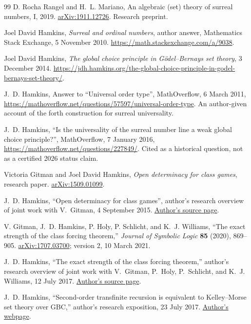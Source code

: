 \documentclass[11pt]{article}
\theoremstyle{definition}
\theoremstyle{remark}
\begin{document}
\begin{thebibliography}{99}
D. Rocha Rangel and H.~L. Mariano,
An algebraic (set) theory of surreal numbers, I, 2019.
\href{https://arxiv.org/abs/1911.12726}{arXiv:1911.12726}. Research preprint.

Joel David Hamkins,
\emph{Surreal and ordinal numbers}, author answer,
Mathematics Stack Exchange, 5 November 2010.
\url{https://math.stackexchange.com/a/9038}.

Joel David Hamkins,
\emph{The global choice principle in G\"odel--Bernays set theory},
3 December 2014.
\url{https://jdh.hamkins.org/the-global-choice-principle-in-godel-bernays-set-theory/}.

J.~D. Hamkins,
Answer to ``Universal order type'', MathOverflow, 6 March 2011,
\url{https://mathoverflow.net/questions/57597/universal-order-type}.
An author-given account of the forth construction for surreal universality.

J.~D. Hamkins,
``Is the universality of the surreal number line a weak global choice
principle?'', MathOverflow, 7 January 2016,
\url{https://mathoverflow.net/questions/227849/}.
Cited as a historical question, not as a certified 2026 status claim.

Victoria Gitman and Joel David Hamkins,
\emph{Open determinacy for class games},
research paper.
\href{https://arxiv.org/abs/1509.01099}{arXiv:1509.01099}.

J.~D. Hamkins,
``Open determinacy for class games'',
author's research overview of joint work with V.~Gitman, 4 September 2015.
\href{https://jdh.hamkins.org/open-determinacy-for-class-games/}{Author's source page}.

V. Gitman, J.~D. Hamkins, P. Holy, P. Schlicht, and K.~J. Williams,
``The exact strength of the class forcing theorem,''
\emph{Journal of Symbolic Logic} \textbf{85} (2020), 869--905.
\href{https://arxiv.org/abs/1707.03700}{arXiv:1707.03700}; version 2,
10 March 2021.

J.~D. Hamkins,
``The exact strength of the class forcing theorem,''
author's research overview of joint work with V.~Gitman, P.~Holy,
P.~Schlicht, and K.~J. Williams, 12 July 2017.
\href{https://jdh.hamkins.org/class-forcing-theorem/}{Author's source page}.

J.~D. Hamkins, ``Second-order transfinite recursion is equivalent to
Kelley--Morse set theory over GBC,'' author's research exposition,
23 July 2017.
\href{https://jdh.hamkins.org/second-order-transfinite-recursion-is-equivalent-to-kelley-morse-set-theory/}{Author's webpage}.


\end{thebibliography}
\end{document}
